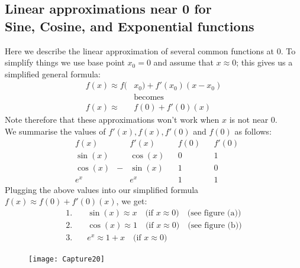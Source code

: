\documentclass{report}
\begin{document}
\subsection{Linear approximations near 0 for\\ Sine, Cosine, and Exponential functions} %
Here we describe the linear approximation of several common functions at 0. 
To simplify things we use base point $x_0=0$ and assume that $x\approx 0$; this gives us 
a simplified general formula:
\begin{align*}
f(x)\approx f(&x_0)+f'(x_0)(x-x_0)\\
&\text{becomes}\\
f(x)\approx &f(0)+f'(0)(x)
\end{align*}
Note therefore that these approximations won't work when $x$ is not near 0.\\
We summarise the values of $f'(x),f(x),f'(0)$ and $f(0)$ as follows:
\begin{align*}
&f(x)    & &f'(x)    & &f(0) & &f'(0)\\
&\sin(x) & &\cos(x)  & &0    & &1\\
&\cos(x) & -&\sin(x) & &1    & &0\\
&e^x     & &e^x      & &1    & &1
\end{align*}
Plugging the above values into our simplified formula $
f(x)\approx f(0)+f'(0)(x)$, we get:
\begin{align*}
1.&\quad\sin(x)\approx x\quad\text{(if $x\approx 0$)}\quad\text{(see figure (a))}\\
2.&\quad\cos(x)\approx 1\quad\text{(if $x\approx 0$)}\quad\text{(see figure (b))}\\
3.&\quad e^x\approx 1+x\quad\text{(if $x\approx 0$)}
\end{align*}
\begin{figure}[h]
\texttt{[image: Capture20]}
\centering
{}
\end{figure}
\newpage
\end{document}
